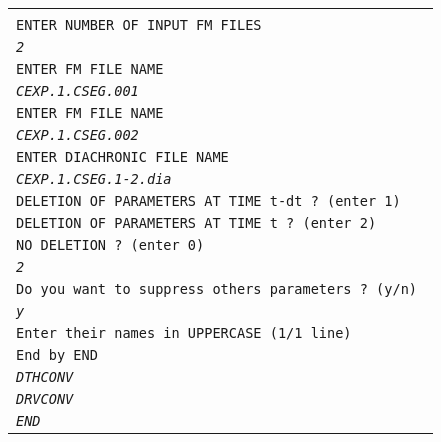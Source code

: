 \small
\begin{tabular}{l}
\\
\\
{\tt ENTER NUMBER OF INPUT FM FILES}  \\
{\tt\it 2 }  \\
{\tt ENTER FM FILE NAME}  \\
{\tt\it CEXP.1.CSEG.001}  \\
{\tt ENTER FM FILE NAME}  \\
{\tt\it CEXP.1.CSEG.002}  \\
{\tt ENTER DIACHRONIC FILE NAME}  \\
{\tt\it CEXP.1.CSEG.1-2.dia}  \\
{\tt DELETION OF PARAMETERS AT TIME t-dt ? (enter 1) } \\
{\tt DELETION OF PARAMETERS AT TIME t    ? (enter 2) } \\
{\tt NO DELETION                         ? (enter 0) } \\
{\tt\it 2 }  \\
{\tt Do you want to suppress others parameters ? (y/n) }\\
{\tt\it y }  \\
{\tt Enter their names in UPPERCASE  (1/1 line) }\\
{\tt End by END}\\
{\tt\it DTHCONV }  \\
{\tt\it DRVCONV }  \\
{\tt\it END }  \\
\end{tabular}
\normalsize
